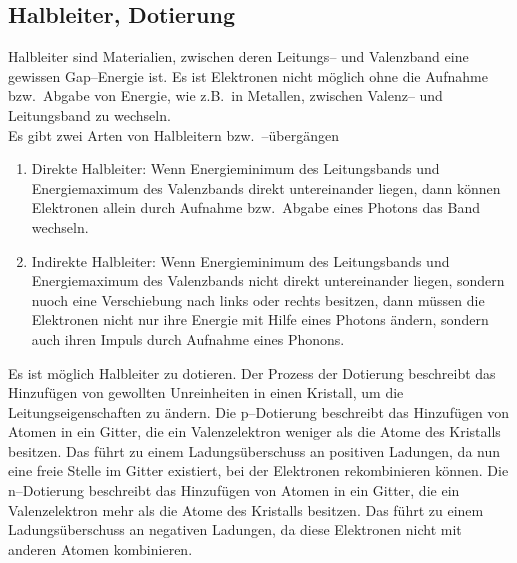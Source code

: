 \documentclass[a4paper,10pt]{article}
\numberwithin{equation}{section}
\begin{document}
\subsection{Halbleiter, Dotierung}
Halbleiter sind Materialien, zwischen deren Leitungs-- und Valenzband eine gewissen Gap--Energie ist.
Es ist Elektronen nicht möglich ohne die Aufnahme bzw.\ Abgabe von Energie, wie z.B.\ in Metallen, zwischen Valenz-- und Leitungsband zu wechseln.
\\Es gibt zwei Arten von Halbleitern bzw.\ --übergängen
\begin{enumerate}[label=--]
        \item Direkte Halbleiter: Wenn Energieminimum des Leitungsbands und Energiemaximum des Valenzbands direkt untereinander liegen, dann können Elektronen allein durch Aufnahme bzw.\ Abgabe eines Photons das Band wechseln.
        \item Indirekte Halbleiter: Wenn Energieminimum des Leitungsbands und Energiemaximum des Valenzbands nicht direkt untereinander liegen, sondern nuoch eine Verschiebung nach links oder rechts besitzen, dann müssen die Elektronen nicht nur ihre Energie mit Hilfe eines Photons ändern, sondern auch ihren Impuls durch Aufnahme eines Phonons.
\end{enumerate}
Es ist möglich Halbleiter zu dotieren.
Der Prozess der Dotierung beschreibt das Hinzufügen von gewollten Unreinheiten in einen Kristall, um die Leitungseigenschaften zu ändern.
Die p--Dotierung beschreibt das Hinzufügen von Atomen in ein Gitter, die ein Valenzelektron weniger als die Atome des Kristalls besitzen.
Das führt zu einem Ladungsüberschuss an \glqq positiven Ladungen\grqq{}, da nun eine freie Stelle im Gitter existiert, bei der Elektronen rekombinieren können.
Die n--Dotierung beschreibt das Hinzufügen von Atomen in ein Gitter, die ein Valenzelektron mehr als die Atome des Kristalls besitzen.
Das führt zu einem Ladungsüberschuss an negativen Ladungen, da diese Elektronen nicht mit anderen Atomen kombinieren.
\end{document}
